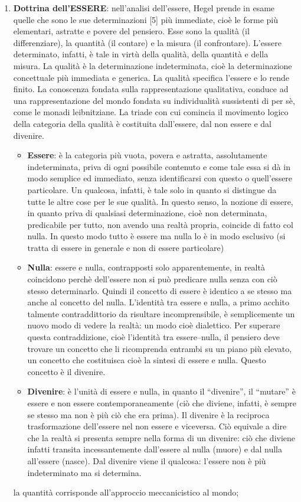 \documentclass[a4paper,12pt,oneside,openany]{book}%
\begin{document}
\begin{enumerate}
	\item \textbf{Dottrina dell’ESSERE}: nell’analisi dell’essere, Hegel prende in esame quelle che sono le sue determinazioni [5] più immediate, cioè le forme più elementari, astratte e povere del pensiero. Esse sono la qualità (il differenziare), la quantità (il contare) e la misura (il confrontare). L’essere determinato, infatti, è tale in virtù della qualità, della quantità e della misura.
	La qualità è la determinazione indeterminata, cioè la determinazione concettuale più immediata e generica. La qualità specifica l’essere e lo rende finito. La conoscenza fondata sulla rappresentazione qualitativa, conduce ad una rappresentazione del mondo fondata su individualità sussistenti di per sè, come le monadi leibnitziane. La triade con cui comincia il movimento logico della categoria della qualità è costituita dall’essere, dal non essere e dal divenire.
	\begin{itemize}
		\item \textbf{Essere}: è la categoria più vuota, povera e astratta, assolutamente indeterminata, priva di ogni possibile contenuto e come tale essa si dà in modo semplice ed immediato, senza identificarsi con questo o quell’essere particolare. Un qualcosa, infatti, è tale solo in quanto si distingue da tutte le altre cose per le sue qualità. In questo senso, la nozione di essere, in quanto priva di qualsiasi determinazione, cioè non determinata, predicabile per tutto, non avendo una realtà propria, coincide di fatto col nulla. In questo modo tutto è essere ma nulla lo è in modo esclusivo (si tratta di essere in generale e non di essere particolare)
		\item \textbf{Nulla}: essere e nulla, contrapposti solo apparentemente, in realtà coincidono perchè dell’essere non si può predicare nulla senza con ciò stesso determinarlo. Quindi il concetto di essere è identico a se stesso ma anche al concetto del nulla. L’identità tra essere e nulla, a primo acchito talmente contraddittorio da risultare incomprensibile, è semplicemente un nuovo modo di vedere la realtà: un modo cioè dialettico. Per superare questa contraddizione, cioè l’identità tra essere–nulla, il pensiero deve trovare un concetto che li ricomprenda entrambi su un piano più elevato, un concetto che costituisca cioè la sintesi di essere e nulla. Questo concetto è il divenire.
		\item \textbf{Divenire}: è l’unità di essere e nulla, in quanto il “divenire”, il “mutare” è essere e non essere contemporaneamente (ciò che diviene, infatti, è sempre se stesso ma non è più ciò che era prima). Il divenire è la reciproca trasformazione dell’essere nel non essere e viceversa. Ciò equivale a dire che la realtà si presenta sempre nella forma di un divenire: ciò che diviene infatti transita incessantemente dall’essere al nulla (muore) e dal nulla all’essere (nasce). Dal divenire viene il qualcosa: l’essere non è più indeterminato ma si determina.
	\end{itemize}
	la quantità corrisponde all’approccio meccanicistico al mondo;
	

\end{enumerate}
\end{document}
